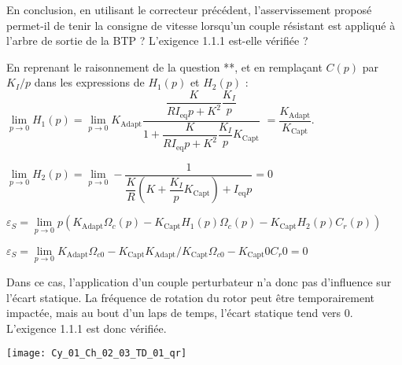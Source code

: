 \begin{question}
En conclusion, en utilisant le correcteur précédent, l'asservissement proposé permet-il de tenir la consigne de vitesse lorsqu'un couple résistant est appliqué à l'arbre de sortie de la BTP ? L'exigence 1.1.1 est-elle vérifiée ?
\end{question}

\ifprof
\begin{corrige}


En reprenant le raisonnement de la question **, et en remplaçant $C(p)$ par $K_I/p$ dans les expressions de $H_1 (p)$ et $H_2 (p)$ :
$\lim\limits_{p\to 0}  H_1 (p)=\lim\limits_{p\to 0}  K_{\text{Adapt}} \dfrac{\dfrac{K}{R I_{\text{eq}} p+K^2}\dfrac{ K_I}{p}}{1+\dfrac{K}{R I_{\text{eq}} p+K^2 } \dfrac{K_I}{p} K_{\text{Capt}} }$
$=\dfrac{K_{\text{Adapt}}}{K_{\text{Capt}}}$.

$\lim\limits_{p\to 0}  H_2 (p)=\lim\limits_{p\to 0}  -\dfrac{1}{\dfrac{K}{R} \left(K+\dfrac{K_I}{p} K_{\text{Capt}} \right)+I_{\text{eq}} p}=0$

$\varepsilon_S=\lim\limits_{p\to 0}  p \left(K_{\text{Adapt}} \Omega_c (p)-K_{\text{Capt}} H_1 (p) \Omega_c (p)-K_{\text{Capt}} H_2 (p) C_r (p)\right) $

$\varepsilon_S=\lim\limits_{p\to 0} K_{\text{Adapt}} \Omega_{c0}-K_{\text{Capt}} K_{\text{Adapt}}/K_{\text{Capt}}  \Omega_{c0}-K_{\text{Capt}} 0 C_r0 =0$

Dans ce cas, l’application d’un couple perturbateur n’a donc pas d’influence sur l’écart statique. La fréquence de rotation du rotor peut être temporairement impactée, mais au bout d’un laps de temps, l’écart statique tend vers 0. L’exigence 1.1.1 est donc vérifiée.

\end{corrige}
\else
\fi


\ifprof
\else
{}
\fi


\ifprof
\else
\begin{marginfigure}
\centering
\texttt{[image: Cy\_01\_Ch\_02\_03\_TD\_01\_qr]}
\end{marginfigure}
\fi

